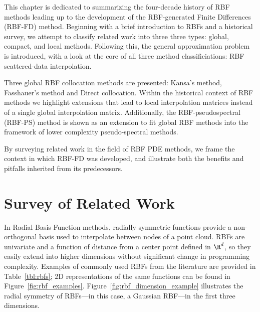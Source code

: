 \documentclass[11pt]{report}
\begin{document}
{This chapter is dedicated to summarizing the four-decade history of RBF methods leading up to the development of the 
RBF-generated Finite Differences (RBF-FD) method. Beginning with a brief introduction to RBFs and a historical survey, we attempt to classify related work into three three types: global, compact, and local methods. Following this, the general approximation problem is introduced, with a look at the core of all three method classificiations: RBF scattered-data interpolation. %

Three global RBF collocation methods are presented: Kansa's method, Fasshauer's method and Direct collocation. Within the historical context of RBF methods we highlight extensions that lead to local interpolation matrices instead of a single global interpolation matrix. Additionally, the RBF-pseudospectral (RBF-PS) method is shown as an extension to fit global RBF methods into the framework of lower complexity pseudo-spectral methods. %

By surveying related work in the field of RBF PDE methods, we frame the context in which RBF-FD was developed, and illustrate both the benefits and pitfalls inherited from its predecessors. 

\section{Survey of Related Work}

In Radial Basis Function methods, radially symmetric functions provide a non-orthogonal basis used to interpolate between 
nodes of a point cloud. RBFs are univariate and a function of distance from a center point defined in $\R^d$, so 
they easily extend into higher dimensions without significant change in programming complexity. Examples of commonly used RBFs from the literature are provided in Table~\ref{tbl:rbfs}; 2D representations of the same functions can be found in Figure~\ref{fig:rbf_examples}. 
Figure~\ref{fig:rbf_dimension_example} illustrates the radial symmetry of RBFs---in this case, a Gaussian RBF---in the first three dimensions. 

}
\end{document}

